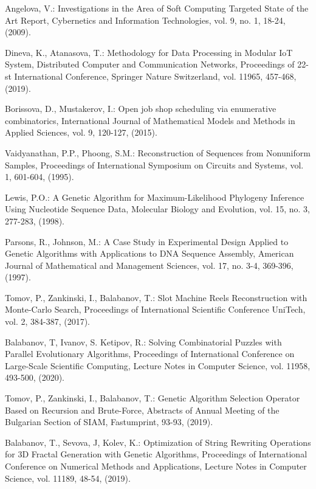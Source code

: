 \documentclass[11pt]{article}
\begin{document}
\begin{thebibliography}{99}

 Angelova, V.: Investigations in the Area of Soft Computing Targeted State of the Art Report, Cybernetics and Information Technologies, vol. 9, no. 1, 18-24, (2009).

 Dineva, K., Atanasova, T.: Methodology for Data Processing in Modular IoT System, Distributed Computer and Communication Networks, Proceedings of 22-st International Conference, Springer Nature Switzerland, vol. 11965, 457-468, (2019).

 Borissova, D., Mustakerov, I.: Open job shop scheduling via enumerative combinatorics, International Journal of Mathematical Models and Methods in Applied Sciences, vol. 9, 120-127, (2015).

 Vaidyanathan, P.P., Phoong, S.M.: Reconstruction of Sequences from Nonuniform Samples, Proceedings of International Symposium on Circuits and Systems, vol. 1, 601-604, (1995).

 Lewis, P.O.: A Genetic Algorithm for Maximum-Likelihood Phylogeny Inference Using Nucleotide Sequence Data, Molecular Biology and Evolution, vol. 15, no. 3, 277-283, (1998).

 Parsons, R., Johnson, M.: A Case Study in Experimental Design Applied to Genetic Algorithms with Applications to DNA Sequence Assembly, American Journal of Mathematical and Management Sciences, vol. 17, no. 3-4, 369-396, (1997).

 Tomov, P., Zankinski, I., Balabanov, T.: Slot Machine Reels Reconstruction with Monte-Carlo Search, Proceedings of International Scientific Conference UniTech, vol. 2, 384-387, (2017).

 Balabanov, T, Ivanov, S. Ketipov, R.: Solving Combinatorial Puzzles with Parallel Evolutionary Algorithms, Proceedings of International Conference on Large-Scale Scientific Computing, Lecture Notes in Computer Science, vol. 11958, 493-500, (2020).

 Tomov, P., Zankinski, I., Balabanov, T.: Genetic Algorithm Selection Operator Based on Recursion and Brute-Force, Abstracts of Annual Meeting of the Bulgarian Section of SIAM, Fastumprint, 93-93, (2019).

 Balabanov, T., Sevova, J, Kolev, K.: Optimization of String Rewriting Operations for 3D Fractal Generation with Genetic Algorithms, Proceedings of International Conference on Numerical Methods and Applications, Lecture Notes in Computer Science, vol. 11189, 48-54, (2019).


\end{thebibliography}
\end{document}
